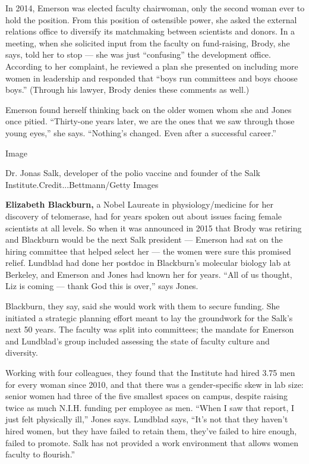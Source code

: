 In 2014, Emerson was elected faculty chairwoman, only the second woman
ever to hold the position. From this position of ostensible power, she
asked the external relations office to diversify its matchmaking between
scientists and donors. In a meeting, when she solicited input from the
faculty on fund-raising, Brody, she says, told her to stop --- she was
just ``confusing'' the development office. According to her complaint,
he reviewed a plan she presented on including more women in leadership
and responded that ``boys run committees and boys choose boys.''
(Through his lawyer, Brody denies these comments as well.)

Emerson found herself thinking back on the older women whom she and
Jones once pitied. ``Thirty-one years later, we are the ones that we saw
through those young eyes,'' she says. ``Nothing's changed. Even after a
successful career.''

Image

Dr. Jonas Salk, developer of the polio vaccine and founder of the Salk
Institute.Credit...Bettmann/Getty Images

\textbf{Elizabeth Blackburn,} a Nobel Laureate in physiology/medicine
for her discovery of telomerase, had for years spoken out about issues
facing female scientists at all levels. So when it was announced in 2015
that Brody was retiring and Blackburn would be the next Salk president
--- Emerson had sat on the hiring committee that helped select her ---
the women were sure this promised relief. Lundblad had done her postdoc
in Blackburn's molecular biology lab at Berkeley, and Emerson and Jones
had known her for years. ``All of us thought, Liz is coming --- thank
God this is over,'' says Jones.

Blackburn, they say, said she would work with them to secure funding.
She initiated a strategic planning effort meant to lay the groundwork
for the Salk's next 50 years. The faculty was split into committees; the
mandate for Emerson and Lundblad's group included assessing the state of
faculty culture and diversity.

Working with four colleagues, they found that the Institute had hired
3.75 men for every woman since 2010, and that there was a
gender-specific skew in lab size: senior women had three of the five
smallest spaces on campus, despite raising twice as much N.I.H. funding
per employee as men. ``When I saw that report, I just felt physically
ill,'' Jones says. Lundblad says, ``It's not that they haven't hired
women, but they have failed to retain them, they've failed to hire
enough, failed to promote. Salk has not provided a work environment that
allows women faculty to flourish.''

